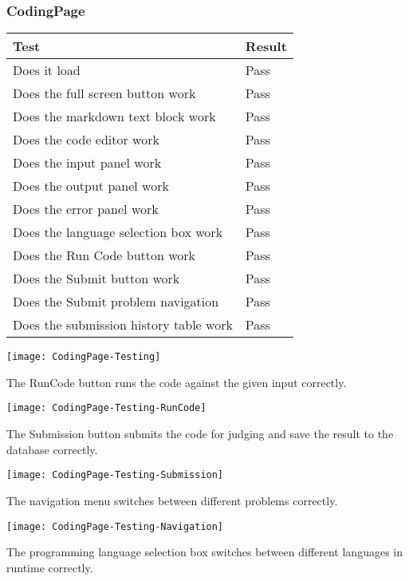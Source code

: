 \documentclass[report.tex]{subfiles}
\begin{document}
\subsubsection{CodingPage}

\begin{tabulary}{\linewidth}{|L|l|}
    \hline
    Test & Result \\
    \hline
    Does it load & Pass \\
    \hline
    Does the full screen button work & Pass \\
    \hline
    Does the markdown text block work & Pass \\
    \hline
    Does the code editor work & Pass \\
    \hline
    Does the input panel work & Pass \\
    \hline
    Does the output panel work & Pass \\
    \hline
    Does the error panel work & Pass \\
    \hline
    Does the language selection box work & Pass \\
    \hline
    Does the Run Code button work & Pass \\
    \hline
    Does the Submit button work & Pass \\
    \hline
    Does the Submit problem navigation & Pass \\
    \hline
    Does the submission history table work & Pass \\
    \hline
\end{tabulary}

\texttt{[image: CodingPage-Testing]}

The RunCode button runs the code against the given input correctly. 

\texttt{[image: CodingPage-Testing-RunCode]}

The Submission button submits the code for judging and save the result to the database correctly.

\texttt{[image: CodingPage-Testing-Submission]}

The navigation menu switches between different problems correctly.

\texttt{[image: CodingPage-Testing-Navigation]}

The programming language selection box switches between different languages in runtime correctly.
\end{document}
